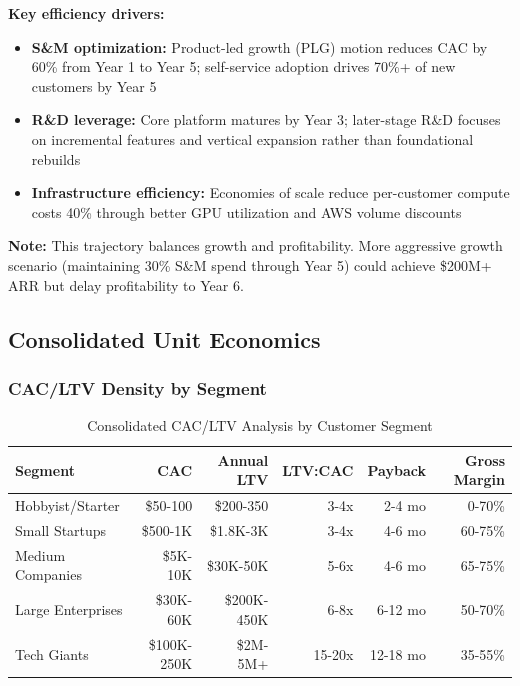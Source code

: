 \textbf{Key efficiency drivers:}
\begin{itemize}[noitemsep]
    \item \textbf{S\&M optimization:} Product-led growth (PLG) motion reduces CAC by 60\% from Year 1 to Year 5; self-service adoption drives 70\%+ of new customers by Year 5
    \item \textbf{R\&D leverage:} Core platform matures by Year 3; later-stage R\&D focuses on incremental features and vertical expansion rather than foundational rebuilds
    \item \textbf{Infrastructure efficiency:} Economies of scale reduce per-customer compute costs 40\% through better GPU utilization and AWS volume discounts
\end{itemize}

\textbf{Note:} This trajectory balances growth and profitability. More aggressive growth scenario (maintaining 30\% S\&M spend through Year 5) could achieve \$200M+ ARR but delay profitability to Year 6.

\subsection{Consolidated Unit Economics}

\subsubsection{CAC/LTV Density by Segment}

\begin{table}[ht]
\centering
\small
\begin{tabular}{|l|r|r|r|r|r|}
\hline
\textbf{Segment} & \textbf{CAC} & \textbf{Annual LTV} & \textbf{LTV:CAC} & \textbf{Payback} & \textbf{Gross Margin} \\
\hline
Hobbyist/Starter & \$50-100 & \$200-350 & 3-4x & 2-4 mo & 0-70\% \\
Small Startups & \$500-1K & \$1.8K-3K & 3-4x & 4-6 mo & 60-75\% \\
Medium Companies & \$5K-10K & \$30K-50K & 5-6x & 4-6 mo & 65-75\% \\
Large Enterprises & \$30K-60K & \$200K-450K & 6-8x & 6-12 mo & 50-70\% \\
Tech Giants & \$100K-250K & \$2M-5M+ & 15-20x & 12-18 mo & 35-55\% \\
\hline
\end{tabular}
\caption{Consolidated CAC/LTV Analysis by Customer Segment}
\end{table}

